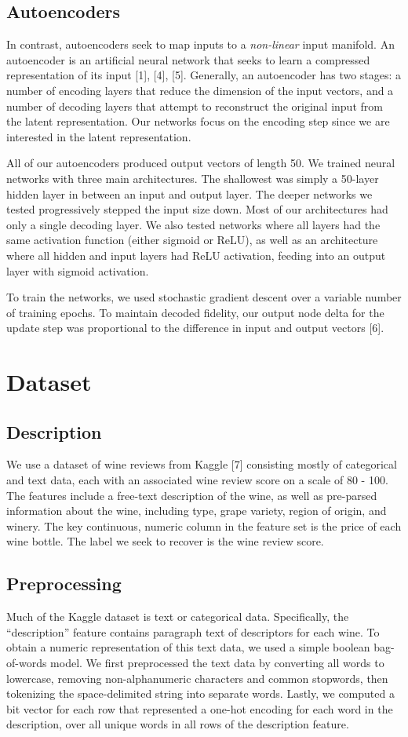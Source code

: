 \documentclass{article}
\begin{document}
\subsection{Autoencoders}
In contrast, autoencoders seek to map inputs to a \emph{non-linear} input manifold. An autoencoder is an artificial neural network that seeks to learn a compressed representation of its input [1], [4], [5]. Generally, an autoencoder has two stages: a number of encoding layers that reduce the dimension of the input vectors, and a number of decoding layers that attempt to reconstruct the original input from the latent representation. Our networks focus on the encoding step since we are interested in the latent representation.

All of our autoencoders produced output vectors of length 50. We trained neural networks with three main architectures. The shallowest was simply a 50-layer hidden layer in between an input and output layer. The deeper networks we tested progressively stepped the input size down. Most of our architectures had only a single decoding layer. We also tested networks where all layers had the same activation function (either sigmoid or ReLU), as well as an architecture where all hidden and input layers had ReLU activation, feeding into an output layer with sigmoid activation.

To train the networks, we used stochastic gradient descent over a variable number of training epochs. To maintain decoded fidelity, our output node delta for the update step was proportional to the difference in input and output vectors [6].
\section{Dataset}
\subsection{Description}
We use a dataset of wine reviews from Kaggle [7] consisting mostly of categorical and text data, each with an associated wine review score on a scale of 80 - 100. The features include a free-text description of the wine, as well as pre-parsed information about the wine, including type, grape variety, region of origin, and winery. The key continuous, numeric column in the feature set is the price of each wine bottle. The label we seek to recover is the wine review score.

\subsection{Preprocessing}
Much of the Kaggle dataset is text or categorical data. Specifically, the “description” feature contains paragraph text of descriptors for each wine. To obtain a numeric representation of this text data, we used a simple boolean bag-of-words model. We first preprocessed the text data by converting all words to lowercase, removing non-alphanumeric characters and common stopwords, then tokenizing the space-delimited string into separate words. Lastly, we computed a bit vector for each row that represented a one-hot encoding for each word in the description, over all unique words in all rows of the description feature.
\end{document}
